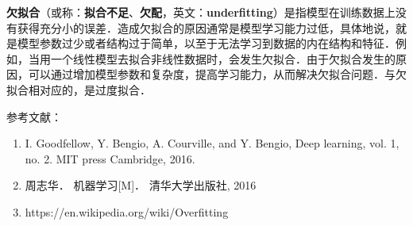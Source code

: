 
\textbf{欠拟合}（或称：\textbf{拟合不足}、\textbf{欠配}，英文：\textbf{underfitting}）是指模型在训练数据上没有获得充分小的误差．造成欠拟合的原因通常是模型学习能力过低，具体地说，就是模型参数过少或者结构过于简单，以至于无法学习到数据的内在结构和特征．例如，当用一个线性模型去拟合非线性数据时，会发生欠拟合．由于欠拟合发生的原因，可以通过增加模型参数和复杂度，提高学习能力，从而解决欠拟合问题．与欠拟合相对应的，是过度拟合．



参考文献：
\begin{enumerate}
\item I. Goodfellow, Y. Bengio, A. Courville, and Y. Bengio, Deep learning, vol. 1, no. 2. MIT press Cambridge, 2016.
\item 周志华． 机器学习[M]． 清华大学出版社, 2016
\item https://en.wikipedia.org/wiki/Overfitting
\end{enumerate}
